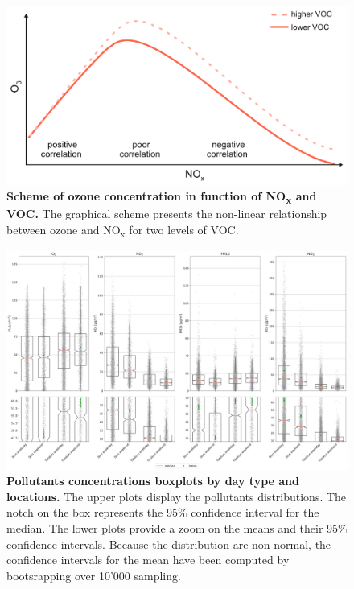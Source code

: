 \documentclass[a4paper, 12pt]{article}
\begin{document}
    \begin{figure}[t!]
        \centering
        \includegraphics[width = 0.6 \textwidth]{Figures/O3vsNOx.png}
        \caption{\textbf{Scheme of ozone concentration in function of NO\textsubscript{x} and VOC.} The graphical scheme presents the non-linear relationship between ozone and NO\textsubscript{x} for two levels of VOC.}
        \label{fig:ozoneScheme}
    \end{figure}
    \begin{figure}[t!]
        \centering
        \includegraphics[width = 1 \textwidth]{Figures/boxplots_pollutants.png}
        \caption{\textbf{Pollutants concentrations boxplots by day type and locations.} The upper plots display the pollutants distributions. The notch on the box represents the 95\% confidence interval for the median. The lower plots provide a zoom on the means and their 95\% confidence intervals. Because the distribution are non normal, the confidence intervals for the mean have been computed by bootsrapping over 10'000 sampling.}
        \label{fig:pollutant_boxplot}
    \end{figure}
\end{document}
